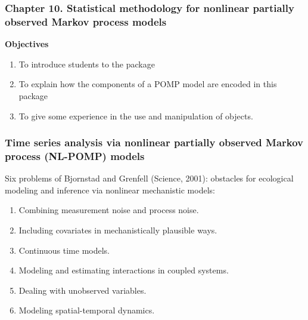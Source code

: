 \documentclass{beamer}\usepackage[]{graphicx}\usepackage[]{color}
\newcommand\CHAPTER{10}
\begin{document}




\begin{frame}[fragile]
\frametitle{Chapter \CHAPTER. Statistical methodology for nonlinear partially observed Markov process models}

\hspace{3cm} {\large \bf Objectives}

\vspace{3mm}

\begin{enumerate}

\item To introduce students to the  package

\item To explain how the components of a POMP model are encoded in this package


\item To give some experience in the use and manipulation of  objects.

\end{enumerate}

\end{frame}

\begin{frame}[fragile]

\frametitle{Time series analysis via nonlinear partially observed Markov process (NL-POMP) models}

Six problems of Bjornstad and Grenfell (Science, 2001): obstacles for ecological modeling and inference via nonlinear mechanistic models:

\begin{enumerate}

\item Combining measurement noise and process noise.

\item Including covariates in mechanistically plausible ways.

\item Continuous time models.

\item Modeling and estimating interactions in coupled systems. 

\item Dealing with unobserved variables.

\item Modeling spatial-temporal dynamics.

\end{enumerate}

\end{frame}  
\end{document}
